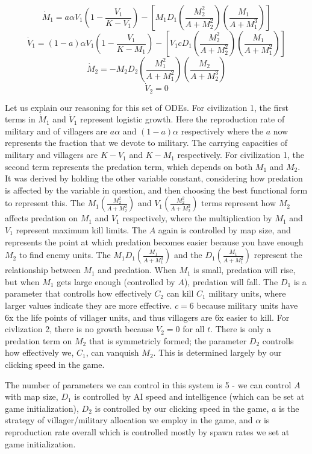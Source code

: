 \documentclass[12pt]{article}
\begin{document}
$$\dot M_1=a \alpha V_1(1-\frac{V_1}{K-V_1})-[M_1D_1(\frac{M_2^2}{A+M_2^2})(\frac{M_1}{A+M_1^3})]$$
$$\dot V_1=(1 - a) \alpha V_1(1-\frac{V_1}{K-M_1})-[V_1cD_1(\frac{M_2^2}{A+M_2^2})(\frac{M_1}{A +M_1^2})]$$
$$\dot M_2=-M_2 D_2(\frac{M_1^2}{A+M_1^2})(\frac{M_2}{A +M_2^3}) $$
$$\dot V_2 = 0 $$

Let us explain our reasoning for this set of ODEs. For civilization 1, the first terms in $\dot M_1$ and $\dot V_1$ represent logistic growth. Here the reproduction rate of military and of villagers are $a \alpha$ and $(1 - a) \alpha$ respectively where the $a$ now represents the fraction that we devote to military. The carrying capacities of military and villagers are $K-V_1$ and $K-M_1$ respectively. For civilization 1, the second term represents the predation term, which depends on both $M_1$ and $M_2$. It was derived by holding the other variable constant, considering how predation is affected by the variable in question, and then choosing the best functional form to represent this. The $M_1 (\frac{M_2^2}{A+M_2^2})$ and $V_1 (\frac{M_2^2}{A+M_2^2})$ terms represent how $M_2$ affects predation on $M_1$ and $V_1$ respectively, where the multiplication by $M_1$ and $V_1$ represent maximum kill limits. The $A$ again is controlled by map size, and represents the point at which predation becomes easier because you have enough $M_2$ to find enemy units. The $M_1 D_1 (\frac{M_1}{A+M_1^3})$ and the $D_1 (\frac{M_1}{A +M_1^2})$ represent the relationship between $M_1$ and predation. When $M_1$ is small, predation will rise, but when $M_1$ gets large enough (controlled by $A$), predation will fall. The $D_1$ is a parameter that controlls how effectively $C_2$ can kill $C_1$ military units, where larger values indicate they are more effective. $c = 6$ because military units have 6x the life points of villager units, and thus villagers are 6x easier to kill. For civlization 2, there is no growth because $V_2 = 0$ for all $t$. There is only a predation term on $M_2$ that is symmetricly formed; the parameter $D_2$ controlls how effectively we, $C_1$, can vanquish $M_2$. This is determined largely by our clicking speed in the game. \par
The number of parameters we can control in this system is 5 - we can control $A$ with map size, $D_1$ is controlled by AI speed and intelligence (which can be set at game initialization), $D_2$ is controlled by our clicking speed in the game, $a$ is the strategy of villager/military allocation we employ in the game, and $\alpha$ is reproduction rate overall which is controlled mostly by spawn rates we set at game initialization.
\end{document}

